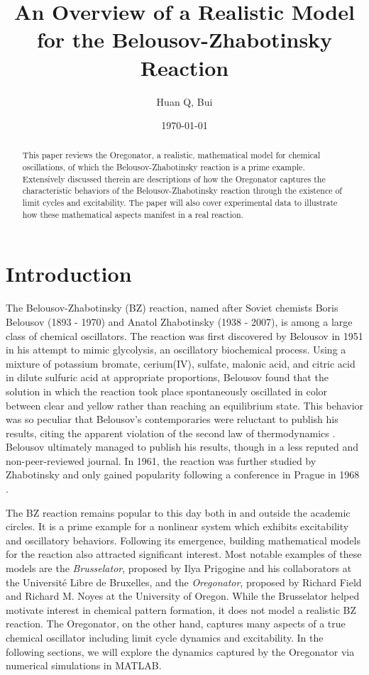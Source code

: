 \documentclass[twocolumn,amsmath,amssymb,aps]{revtex4}
\begin{document}
\title{An Overview of a Realistic Model for the Belousov-Zhabotinsky Reaction}%
\author{Huan Q, Bui}
\date{\today}
\begin{abstract}
This paper reviews the Oregonator, a realistic, mathematical model for chemical oscillations, of which the Belousov-Zhabotinsky reaction is a prime example. Extensively discussed therein are descriptions of how the Oregonator captures the characteristic behaviors of the Belousov-Zhabotinsky reaction through the existence of limit cycles and excitability. The paper will also cover experimental data to illustrate how these mathematical aspects manifest in a real reaction. 
\end{abstract}
\maketitle




\section{Introduction}
The Belousov-Zhabotinsky (BZ) reaction, named after Soviet chemists Boris Belousov (1893 - 1970) and Anatol Zhabotinsky (1938 - 2007), is among a large class of chemical oscillators. The reaction was first discovered by Belousov in 1951 in his attempt to mimic glycolysis, an oscillatory biochemical process. Using a mixture of potassium bromate, cerium(IV), sulfate, malonic acid, and citric acid in dilute sulfuric acid at appropriate proportions, Belousov found that the solution in which the reaction took place spontaneously oscillated in color between clear and yellow rather than reaching an equilibrium state. This behavior was so peculiar that Belousov's contemporaries were reluctant to publish his results, citing the apparent violation of the second law of thermodynamics \cite{ball1999self}. Belousov ultimately managed to publish his results, though in a less reputed and non-peer-reviewed journal. In 1961, the reaction was further studied by Zhabotinsky and only gained popularity following a conference in Prague in 1968 \cite{doi:10.1021/ed061p661}.

The BZ reaction remains popular to this day both in and outside the academic circles. It is a prime example for a nonlinear system which exhibits excitability and oscillatory behaviors. Following its emergence, building mathematical models for the reaction also attracted significant interest. Most notable examples of these models are the \textit{Brusselator}, proposed by Ilya Prigogine and his collaborators at the Université Libre de Bruxelles, and the \textit{Oregonator}, proposed by Richard Field and Richard M. Noyes at the University of Oregon. While the Brusselator helped motivate interest in chemical pattern formation, it does not model a realistic BZ reaction. The Oregonator, on the other hand, captures many aspects of a true chemical oscillator including limit cycle dynamics and excitability. In the following sections, we will explore the dynamics captured by the Oregonator via numerical simulations in MATLAB. 
\end{document}
